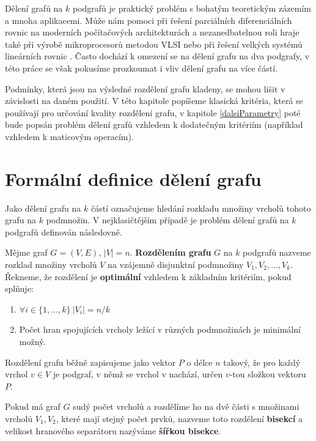 \documentclass[11pt,american,czech,oneside]{book}
\theoremstyle{plain}
\theoremstyle{definition}
\begin{document}
Dělení grafů na $k$ podgrafů je praktický problém s bohatým teoretickým zázemím a mnoha aplikacemi. Může nám pomoci při řešení parciálních diferenciálních rovnic na moderních počítačových architekturách \cite{posl:90} a nezanedbatelnou roli hraje také při výrobě mikroprocesorů metodou VLSI nebo při řešení velkých systémů lineárních rovnic \cite{keli:70, pis:84}. Často dochází k omezení se na dělení grafu na dva podgrafy, v této práce se však pokusíme prozkoumat i vliv dělení grafu na více částí.

Podmínky, která jsou na výsledné rozdělení grafu kladeny, se mohou lišit v závislosti na daném použití. V této kapitole popíšeme klasická kritéria, která se používají pro určování kvality rozdělení grafu, v kapitole \ref{dalsiParametry} poté bude popsán problém dělení grafů vzhledem k dodatečným kritériím (například vzhledem k maticovým operacím).

\section{Formální definice dělení grafu}

Jako dělení grafu na $k$ částí označujeme hledání rozkladu množiny vrcholů tohoto grafu na $k$ podmnožin. V nejklasičtějším případě je problém dělení grafů na $k$ podgrafů definován následovně.

Mějme graf $G=(V,E)$, $|V| = n$. \textbf{Rozdělením grafu} $G$ na $k$ podgrafů nazveme rozklad množiny vrcholů $V$ na vzájemně disjunktní podmnožiny $V_1, V_2, \ldots, V_k$. Řekneme, že rozdělení je \textbf{optimální} vzhledem k základním kritériím, pokud splňuje:
\begin{enumerate}
  \item $\forall i \in \{1, \ldots, k \} \ |V_i|=n/k$
  \item Počet hran spojujících vrcholy ležící v různých podmnožinách je minimální možný.
\end{enumerate}

Rozdělení grafu běžně zapisujeme jako vektor $P$ o délce $n$ takový, že pro každý vrchol $v \in V$ je podgraf, v němž se vrchol v nachází, určen $v$-tou složkou vektoru $P$.

Pokud má graf $G$ sudý počet vrcholů a rozdělíme ho na dvě části s množinami vrcholů $V_1, V_2$, které mají stejný počet prvků, nazveme toto rozdělení \textbf{bisekcí} a velikost hranového separátoru nazýváme \textbf{šířkou bisekce}.
\end{document}
